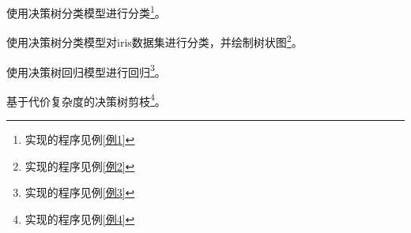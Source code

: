 \begin{Example}
	使用决策树分类模型进行分类\footnote{实现的程序见例\ref{例1}}。
\end{Example}

\begin{Example}
	使用决策树分类模型对iris数据集进行分类，并绘制树状图\footnote{实现的程序见例\ref{例2}}。
\end{Example}

\begin{Example}
	使用决策树回归模型进行回归\footnote{实现的程序见例\ref{例3}}。
\end{Example}

\begin{Example}
	基于代价复杂度的决策树剪枝\footnote{实现的程序见例\ref{例4}}。
\end{Example}
